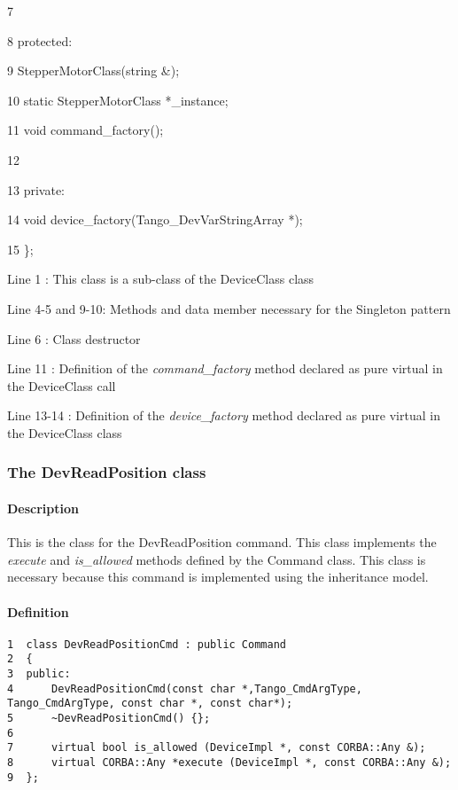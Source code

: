      7          

     8  protected:

     9          StepperMotorClass(string \&);

    10          static StepperMotorClass {*}\_instance;

    11          void command\_factory();

    12          

    13  private:

    14          void device\_factory(Tango\_DevVarStringArray {*});

    15  \};



Line 1 : This class is a sub-class of the DeviceClass class

Line 4-5 and 9-10: Methods and data member necessary for the Singleton
pattern

Line 6 : Class destructor

Line 11 : Definition of the \emph{command\_factory}
method declared as pure virtual in the DeviceClass call

Line 13-14 : Definition of the \emph{device\_factory}
method declared as pure virtual in the DeviceClass class


\subsubsection{The DevReadPosition class}


\paragraph{Description}

This is the class for the DevReadPosition command. This class implements
the \emph{execute} and \emph{is\_allowed}
methods defined by the Command class. This class is
necessary because this command is implemented using the inheritance
model.


\paragraph{Definition}


\begin{verbatim}
1  class DevReadPositionCmd : public Command
2  {
3  public:
4      DevReadPositionCmd(const char *,Tango_CmdArgType, Tango_CmdArgType, const char *, const char*);
5      ~DevReadPositionCmd() {};
6          
7      virtual bool is_allowed (DeviceImpl *, const CORBA::Any &);
8      virtual CORBA::Any *execute (DeviceImpl *, const CORBA::Any &);
9  };
\end{verbatim}


